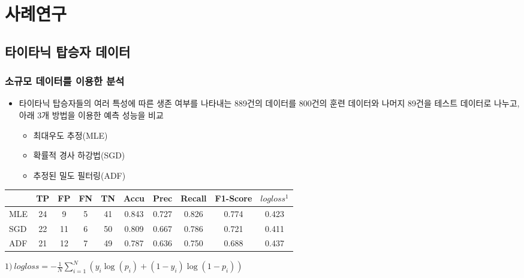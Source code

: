 \documentclass{beamer}
\begin{document}
\section{사례연구} %

\subsection{타이타닉 탑승자 데이터} %

\begin{frame}
\frametitle{소규모 데이터를 이용한 분석}


{\footnotesize
\begin{itemize}

    \item 타이타닉 탑승자들의 여러 특성에 따른 생존 여부를 나타내는 889건의 데이터를 800건의 훈련 데이터와 나머지 89건을 테스트 데이터로 나누고, 아래 3개 방법을 이용한 예측 성능을 비교
        \begin{itemize}
        [circle]
        \item 최대우도 추정(MLE)
        \item 확률적 경사 하강법(SGD)
        \item 추정된 밀도 필터링(ADF)
        \end{itemize}
\end{itemize}
}


{\scriptsize
	\begin{center}%
	\begin{tabular}{cccccccccc}
	\hline\hline
	\textbf{} & \textbf{TP} & \textbf{FP} & \textbf{FN} & \textbf{TN} & \textbf{Accu} & \textbf{Prec} & \textbf{Recall} & \textbf{F1-Score} & \textbf{$logloss^1$}  \\
	\hline
	
	\multicolumn {1}{l|}{MLE} & 24 & 9  & 5 & 41 & 0.843 & 0.727 & 0.826 & 0.774 & 0.423 \\ \hline
	\multicolumn {1}{l|}{SGD} & 22 & 11 & 6 & 50 & 0.809 & 0.667 & 0.786 & 0.721 & 0.411 \\ \hline
	\multicolumn {1}{l|}{ADF} & 21 & 12 & 7 & 49 & 0.787 & 0.636 & 0.750 & 0.688 & 0.437 \\ \hline

	\hline
	\end{tabular}
    \end{center}
}



	\begin{flushright}
    {\tiny $1)~logloss = -\frac{1}{N}\sum_{i=1}^N {(y_i\log(p_i) + (1 - y_i)\log(1 - p_i))}$}
    \end{flushright}

\end{frame}
\end{document}

